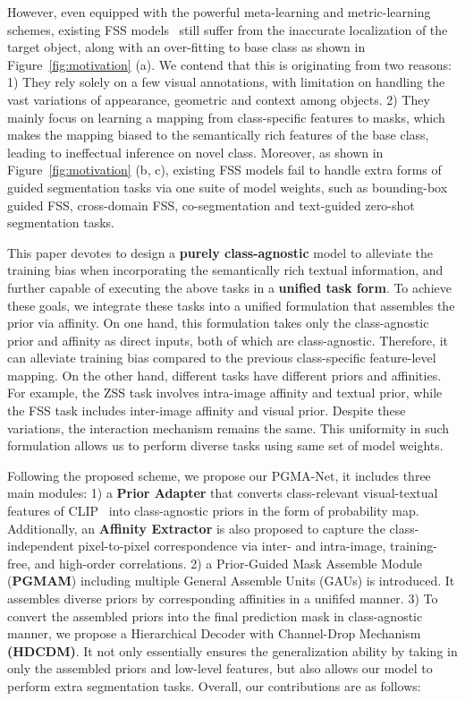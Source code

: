 \documentclass[lettersize,journal]{IEEEtran}
\begin{document}
However, even equipped with the powerful meta-learning and metric-learning schemes, existing FSS models~\cite{zhang2019pyramid,liu2020part,tian2020prior,boudiaf2021few,min2021hypercorrelation,fan2022self,liu2023fecanet,9999056} still suffer from the inaccurate localization of the target object, along with an over-fitting to base class as shown in Figure~\ref{fig:motivation} (a). We contend that this is originating from two reasons: 1) They rely solely on a few visual annotations, with limitation on handling the vast variations of appearance, geometric and context among objects. 2) They mainly focus on learning a mapping from class-specific features to masks, which makes the mapping biased to the semantically rich features of the base class, leading to ineffectual inference on novel class. Moreover, as shown in Figure~\ref{fig:motivation} (b, c), existing FSS models fail to handle extra forms of guided segmentation tasks via one suite of model weights, such as bounding-box guided FSS, cross-domain FSS, co-segmentation and text-guided zero-shot segmentation tasks.  

This paper devotes to design a \textbf{purely class-agnostic} model to alleviate the training bias when incorporating the semantically rich textual information, and further capable of executing the above tasks in a \textbf{unified task form}. To achieve these goals, we integrate these tasks into a unified formulation that assembles the prior via affinity. On one hand, this formulation takes only the class-agnostic prior and affinity as direct inputs, both of which are class-agnostic. Therefore, it can alleviate training bias compared to the previous class-specific feature-level mapping. On the other hand, different tasks have different priors and affinities. For example, the ZSS task involves intra-image affinity and textual prior, while the FSS task includes inter-image affinity and visual prior. Despite these variations, the interaction mechanism remains the same. This uniformity in such formulation allows us to perform diverse tasks using same set of model weights.


Following the proposed scheme, we propose our PGMA-Net, it includes three main modules: 1) a \textbf{Prior Adapter} that converts class-relevant visual-textual features of CLIP~\cite{radford2021learning} into class-agnostic priors in the form of probability map. Additionally, an \textbf{Affinity Extractor} is also proposed to capture the class-independent pixel-to-pixel correspondence via inter- and intra-image, training-free, and high-order correlations. 2) a Prior-Guided Mask Assemble Module (\textbf{PGMAM}) including multiple General Assemble Units (GAUs) is introduced. It assembles diverse priors by corresponding affinities in a unififed manner. 3) To convert the assembled priors into the final prediction mask in class-agnostic manner, we propose a Hierarchical Decoder with Channel-Drop Mechanism \textbf{(HDCDM)}. It not only essentially ensures the generalization ability by taking in only the assembled priors and low-level features, but also allows our model to perform extra segmentation tasks. Overall, our contributions are as follows:
\end{document}
